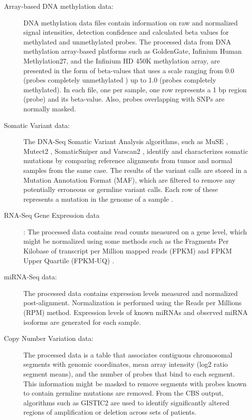 \begin{description}
  \item [Array-based DNA methylation data:]
  DNA methylation data files contain information on raw and normalized signal intensities, detection confidence and calculated beta values for methylated and unmethylated probes.
  The processed data from DNA methylation array-based platforms such as GoldenGate, Infinium Human Methylation27, and the Infinium HD 450K methylation array, are presented in the form of beta-values that uses a scale ranging from 0.0 (probes completely unmethylated ) up to 1.0 (probes completely methylated). In each file, one per sample,  one row represents a 1 bp region (probe) and its beta-value. Also, probes overlapping with SNPs are normally masked.
  \item [Somatic Variant data:]  The DNA-Seq Somatic Variant Analysis algorithms, such as MuSE \cite{fan2016muse}, Mutect2 \cite{cibulskis2013sensitive}, SomaticSniper \cite{larson2011somaticsniper} and Varscan2 \cite{koboldt2012varscan},   identify and characterizes somatic mutations by comparing reference alignments from tumor and normal samples from the same case.  The   results of the variant calls are stored in a Mutation Annotation Format (MAF), which are filtered to remove any potentially erroneous or germline variant calls. Each row of these  represents a mutation in the genome of a sample \cite{GDC_maf}.
  \item [RNA-Seq Gene Expression data]: The processed data contains read counts measured on a gene level, which might be normalized using some methods such as the Fragments Per Kilobase of transcript per Million mapped reads (FPKM) \cite{GDC_fpmk} and FPKM Upper Quartile (FPKM-UQ) \cite{GDC_fpmkuq}.
  \item [miRNA-Seq  data:]  The processed data contains expression levels measured and normalized post-alignment. Normalization is performed using the Reads per Millions (RPM) method. Expression levels of known miRNAs and observed miRNA isoforms are generated for each sample.
  \item [Copy Number Variation data:] The processed data is a table that associates contiguous chromosomal segments with genomic coordinates, mean array intensity (log2 ratio segment means), and the number of probes that bind to each segment. This information might be masked to remove segments with probes known to contain germline mutations are removed.
  From the CBS output, algorithms such as GISTIC2 \cite{mermel2011gistic2} are used to identify significantly altered regions of amplification or deletion across sets of patients.

\end{description}
